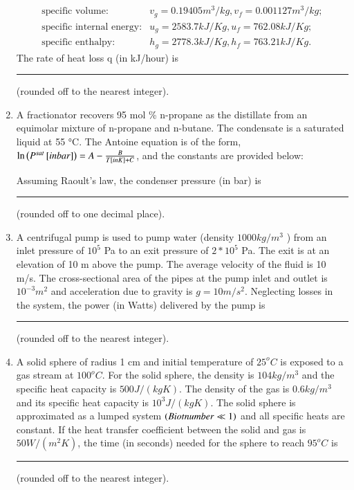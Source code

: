 \documentclass[journal]{IEEEtran}
\begin{document}
\begin{enumerate}
    \begin{align*}
        \text{specific volume:} & v_g = 0.19405 m^3/kg,  v_f = 0.001127 m^3/kg; \\
        \text{specific internal energy:} & u_g = 2583.7 kJ/Kg,  u_f = 762.08 kJ/Kg;\\
        \text{specific enthalpy:} & h_g = 2778.3 kJ/Kg,  h_f = 763.21 kJ/Kg.
    \end{align*} 
    The rate of heat loss q (in kJ/hour) is \rule{2cm}{0.1mm}(rounded off to the nearest integer). 

    \item A fractionator recovers 95 mol \% n-propane as the distillate from an equimolar mixture of n-propane and n-butane. The condensate is a saturated liquid at 55 °C. The Antoine equation is of the form, $\ln\left(P^{sat}{}\left[in bar\right]\right) = A - \frac{B}{T{}\left[in K\right] + C}$, and the constants are provided below: 

    

    Assuming Raoult's law, the condenser pressure (in bar) is \rule{3cm}{0.1mm} (rounded off to one decimal place).

    \item A centrifugal pump is used to pump water (density $1000 kg/m^3$ ) from an inlet pressure of $10^5$ Pa to an exit pressure of $2*10^5$ Pa. The exit is at an elevation of 10 m above the pump. The average velocity of the fluid is 10 m/s. The cross-sectional area of the pipes at the pump inlet and outlet is $10^{-3} m^2$ and acceleration due to gravity is $g = 10 m/s^2 $. Neglecting losses in the system, the power (in Watts) delivered by the pump is \rule{1.5cm}{0.1mm}(rounded off to the nearest integer). 

    \item A solid sphere of radius 1 cm and initial temperature of $25^oC$ is exposed to a gas stream at $100^oC$. For the solid sphere, the density is $104 kg/m^3$ and the specific heat capacity is $500 J/(kg K)$. The density of the gas is $0.6 kg/m^3$ and its specific heat capacity is $10^3 J/(kg K)$. The solid sphere is approximated as a lumped system $\left(Biot number \ll 1\right)$ and all specific heats are constant. If the heat transfer coefficient between the solid and gas is $50 W/(m^2 K)$, the time (in seconds) needed for the sphere to reach $95^oC$ is \rule{2cm}{0.1mm} (rounded off to the nearest integer).


\end{enumerate}
\end{document}
